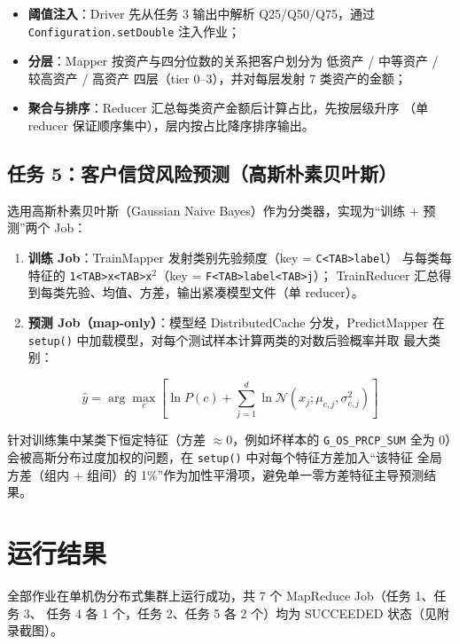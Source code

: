 \documentclass[UTF8,a4paper,12pt]{ctexart}
\begin{document}
\begin{itemize}
  \item \textbf{阈值注入}：Driver 先从任务 3 输出中解析 Q25/Q50/Q75，通过
        \texttt{Configuration.setDouble} 注入作业；
  \item \textbf{分层}：Mapper 按资产与四分位数的关系把客户划分为 低资产 / 中等资产 /
        较高资产 / 高资产 四层（tier 0--3），并对每层发射 7 类资产的金额；
  \item \textbf{聚合与排序}：Reducer 汇总每类资产金额后计算占比，先按层级升序
        （单 reducer 保证顺序集中），层内按占比降序排序输出。
\end{itemize}

\subsection{任务 5：客户信贷风险预测（高斯朴素贝叶斯）}

选用高斯朴素贝叶斯（Gaussian Naive Bayes）作为分类器，实现为“训练 + 预测”两个 Job：

\begin{enumerate}
  \item \textbf{训练 Job}：TrainMapper 发射类别先验频度（key = \texttt{C<TAB>label}）
        与每类每特征的 \texttt{1<TAB>x<TAB>x$^2$}（key = \texttt{F<TAB>label<TAB>j}）；
        TrainReducer 汇总得到每类先验、均值、方差，输出紧凑模型文件（单 reducer）。
  \item \textbf{预测 Job（map-only）}：模型经 DistributedCache 分发，PredictMapper
        在 \texttt{setup()} 中加载模型，对每个测试样本计算两类的对数后验概率并取
        最大类别：
\end{enumerate}

\[
\hat{y} = \arg\max_{c} \left[
  \ln P(c) + \sum_{j=1}^{d} \ln \mathcal{N}(x_j; \mu_{c,j}, \sigma^2_{c,j})
\right]
\]

针对训练集中某类下恒定特征（方差 $\approx 0$，例如坏样本的 \texttt{G\_OS\_PRCP\_SUM}
全为 0）会被高斯分布过度加权的问题，在 \texttt{setup()} 中对每个特征方差加入“该特征
全局方差（组内 + 组间）的 1\%”作为加性平滑项，避免单一零方差特征主导预测结果。

\section{运行结果}

全部作业在单机伪分布式集群上运行成功，共 7 个 MapReduce Job（任务 1、任务 3、
任务 4 各 1 个，任务 2、任务 5 各 2 个）均为 SUCCEEDED 状态（见附录截图）。
\end{document}

